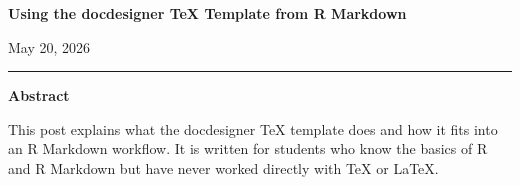 \documentclass[12pt]{article}
\newif\ifdocdesigneranon
\begin{document}
\begin{titlepage}
\thispagestyle{empty}
\vspace*{0.12\textheight}
\begin{center}
\begin{singlespace}

{\LARGE\bfseries Using the docdesigner TeX Template from R
Markdown\par}


\vspace{2.2em}

\docdesignerauthorblock

\par\vspace{1.5\baselineskip}
\docdesignerseriesblock

\ifdocdesigneranon\else
\vspace{0.35em}
{\small May 20, 2026}\par
\fi

\vspace{2.2\baselineskip}
\noindent\rule{0.35\textwidth}{0.4pt}\par
\vspace{0.65em}
\begin{minipage}{0.78\textwidth}
\small\singlespacing
\textbf{Abstract}\par\vspace{0.3em}
This post explains what the docdesigner TeX template does and how it fits into
an R Markdown workflow. It is written for students who know the basics
of R and R Markdown but have never worked directly with TeX or LaTeX.
\end{minipage}

\end{singlespace}
\end{center}
\vfill
\end{titlepage}
\else
\end{document}
